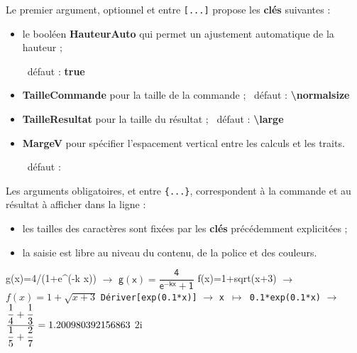 \documentclass[french,a4paper,11pt]{article}
\newcommand\Cle[1]{{\bfseries\sffamily\textlangle #1\textrangle}}
\begin{document}
\begin{tipblock}
Le premier argument, optionnel et entre \texttt{[...]} propose les \Cle{clés} suivantes :

\begin{itemize}
	\item le booléen \Cle{HauteurAuto} qui permet un ajustement automatique de la hauteur ;
	
	\hfill~défaut : \Cle{true}
	\item \Cle{TailleCommande} pour la taille de la commande ; \hfill~défaut : \Cle{\textbackslash normalsize}
	\item \Cle{TailleResultat} pour la taille du résultat ; \hfill~défaut : \Cle{\textbackslash large}
	\item \Cle{MargeV} pour spécifier l'espacement vertical entre les calculs et les traits.
	
	\hfill~défaut : \Cle{6pt}
\end{itemize}
\vspace*{-\baselineskip}\leavevmode
\end{tipblock}

\begin{tipblock}
Les arguments obligatoires, et entre \texttt{\{...\}}, correspondent à la commande et au résultat à afficher dans la ligne :

\begin{itemize}
	\item les tailles des caractères sont fixées par les \Cle{clés} précédemment explicitées ;
	\item la saisie est libre au niveau du contenu, de la police et des couleurs.
\end{itemize}
\end{tipblock}

\begin{PresentationCode}{}
\begin{CalculFormelGeogebra}[CouleurEntete=pink!25,CouleurNumero=yellow!25,Largeur=15]
	\LigneCalculsGeogebra%
		{\sffamily g(x)=4/(1+e\textasciicircum(-k x))}
		{$\rightarrow$ \: $\mathsf{g(x)=\dfrac{4}{e^{-kx}+1}}$}
	\LigneCalculsGeogebra
		{f(x)=1+sqrt(x+3)}
		{$\rightarrow$ \: $f(x)=1+\sqrt{x+3}$}
	\LigneCalculsGeogebra
		{\texttt{Dériver[exp(0.1*x)]}}
		{$\rightarrow$ \: \texttt{x $\mapsto$ 0.1*exp(0.1*x)}}
		{$\rightarrow$ \: $\dfrac{\dfrac14+\dfrac13}{\dfrac15+\dfrac27}=
			\fpeval{(1/4+1/3)/(1/5+2/7)}$}
		{$2\text{i}$}
\end{CalculFormelGeogebra}
\end{PresentationCode}
\end{document}
